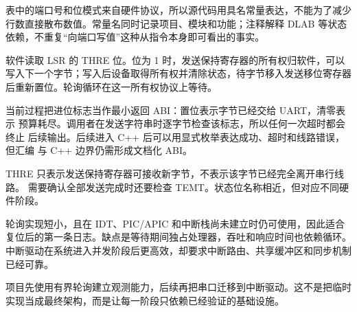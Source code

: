 表中的端口号和位模式来自硬件协议，所以源代码用具名常量表达，不能为了减少
行数直接散布数值。常量名同时记录项目、模块和功能；注释解释 DLAB 等状态
依赖，不重复“向端口写值”这种从指令本身即可看出的事实。

软件读取 LSR 的 THRE 位。位为 1 时，发送保持寄存器的所有权归软件，可以
写入下一个字节；写入后设备取得所有权并清除状态，待字节移入发送移位寄存器
后重新置位。轮询循环在这一所有权协议上等待。

当前过程把进位标志当作最小返回 ABI：置位表示字节已经交给 UART，清零表示
预算耗尽。调用者在发送字符串时逐字节检查该标志，所以任何一次超时都会终止
后续输出。后续进入 C++ 后可以用显式枚举表达成功、超时和线路错误，但汇编
与 C++ 边界仍需形成文档化 ABI。

\begin{failurebox}
THRE 只表示发送保持寄存器可接收新字节，不表示该字节已经完全离开串行线路。
需要确认全部发送完成时还要检查 TEMT。状态位名称相近，但对应不同硬件阶段。
\end{failurebox}

轮询实现短小，且在 IDT、PIC/APIC 和中断栈尚未建立时仍可使用，因此适合
复位后的第一条日志。缺点是等待期间独占处理器，吞吐和响应时间也依赖循环。
中断驱动在系统进入并发阶段后更高效，却要求中断路由、共享缓冲区和同步机制
已经可靠。

项目先使用有界轮询建立观测能力，后续再把串口迁移到中断驱动。这不是把临时
实现当成最终架构，而是让每一阶段只依赖已经验证的基础设施。
